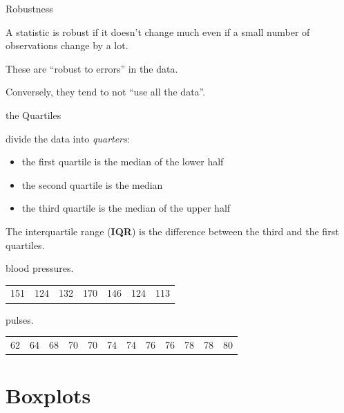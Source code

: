 \begin{frame}{Robustness}

    A statistic is \alert{robust} if it doesn't change much
    even if a small number of observations change by a lot.

    \vspace{3em}

    These are ``robust to errors'' in the data.

    \vspace{3em}

    Conversely, they tend to not ``use all the data''.

\end{frame}


\begin{frame}{the Quartiles}

    divide the data into \emph{quarters}:
    \begin{itemize}
        \item the \alert{first quartile} is the median of the {lower half}
        \item the \alert{second quartile} is the median
        \item the \alert{third quartile} is the median of the {upper half}
    \end{itemize}

    The \alert{interquartile range} (\textbf{IQR}) is the difference between the third and the first quartiles.

    \pause

     blood pressures.
    \begin{center}
        \begin{tabular}{ccccccc}
            151 & 124 & 132 & 170 & 146 & 124 & 113
        \end{tabular}
    \end{center}

    \pause

     pulses.
    \begin{center}
        \begin{tabular}{cccccccccccc}
            62 & 64 & 68 & 70 & 70 & 74 & 74 & 76 & 76 & 78 & 78 & 80 
        \end{tabular}
    \end{center}

\end{frame}


\section{Boxplots}

